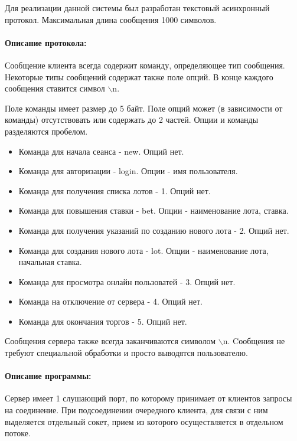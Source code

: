 Для реализации данной системы был разработан текстовый асинхронный протокол. Максимальная длина сообщения 1000 символов. 


\paragraph{Описание протокола:}

Сообщение клиента всегда содержит команду, определяющее тип сообщения. Некоторые типы сообщений содержат также поле опций. В конце каждого сообщения ставится символ $\backslash$n.

Поле команды имеет размер до 5 байт. Поле опций может (в зависимости от команды) отсутствовать или содержать до 2 частей. Опции и команды разделяются пробелом.

\begin{itemize}
\item Команда для начала сеанса - new. Опций нет.
\item Команда для авторизации - login. Опции - имя пользователя.
\item Команда для получения списка лотов - 1. Опций нет.
\item Команда для повышения ставки - bet. Опции - наименование лота, ставка.
\item Команда для получения указаний по созданию нового лота - 2. Опций нет. 
\item Команда для создания нового лота - lot. Опции - наименование лота, начальная ставка. 
\item Команда для просмотра онлайн пользоватей - 3. Опций нет.
\item Команда на отключение от сервера - 4. Опций нет.
\item Команда для окончания торгов - 5. Опций нет.
\end{itemize}


Сообщения сервера также всегда заканчиваются символом $\backslash$n. Cообщения не требуют специальной обработки и просто выводятся пользователю.

\paragraph{Описание программы:}

Сервер имеет 1 слушающий порт, по которому принимает от клиентов запросы на соединение. При подсоединении очередного клиента, для связи с ним выделяется отдельный сокет, прием из которого осуществляется в отдельном потоке. 

